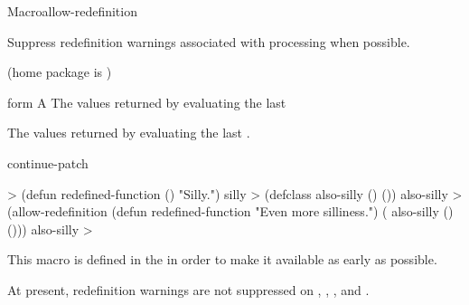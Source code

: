 \documentclass[10pt,twoside,english,pdftex]{article}
\begin{document}
\begin{functiondoc}{Macro}{allow-redefinition}{%
    }
%
%

\fnsyntax 

\fnpurpose Suppress redefinition warnings associated with processing 
 when possible.

\fnpackage {} (home package is
)

\fnmodule {}

\fnargs
\begin{args}{form}
\arg[form] A 
\arg[results] The values returned by evaluating the last 
\end{args}

\fnreturns The values returned by evaluating the last .

\begin{alsos}{continue-patch}
\also[patch]
\end{alsos}

\fnexample
%
\W\supp
\begin{example}
  > (defun redefined-function () "Silly.")
  silly
  > (defclass also-silly () ())
  also-silly
  > (allow-redefinition
       (defun redefined-function "Even more silliness.")
       ( also-silly () ()))
  also-silly
  >
\end{example}

\fnnote
{}%
%
%
This macro is defined in the  
in order to make it available as early as possible.

At present, redefinition warnings are not suppressed on
,
,
, and .

\end{functiondoc}

\end{document}
